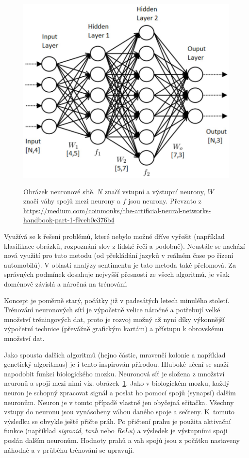 \begin{figure}[!htb]
\centering
\includegraphics[width=\textwidth/2]{neural_network.png}
\label{neuronovasit}
\caption{Obrázek neuronové sítě. $N$ značí vstupní a výstupní neurony, $W$ značí váhy spojů mezi neurony a $f$ jsou  neurony. Převzato z \url{https://medium.com/coinmonks/the-artificial-neural-networks-handbook-part-1-f9ceb0e376b4}}
\end{figure}

 Využívá se k řešení problémů, které nebylo možné dříve vyřešit (například klasifikace obrázků, rozpoznání slov z lidské řeči a podobně). Neustále se nachází nová využití pro tuto metodu (od překládání jazyků v reálném čase po řízení automobilů).
V oblasti analýzy sentimentu je tato metoda také přelomová. Za správných podmínek dosahuje nejvyšší přesnosti ze všech algoritmů, je však doménově závislá a náročná na trénování.


Koncept je poměrně starý, počátky již v padesátých letech minulého století. Trénování neuronových sítí je výpočetně velice náročné a potřebují velké množství tréningových dat, proto je rozvoj možný až nyní díky výkonnější výpočetní technice (převážně grafickým kartám) a přístupu k obrovskému množství dat. 

Jako spousta dalších algoritmů (hejno částic, mravenčí kolonie a například genetický algoritmus) je i tento inspirován přírodou.
Hluboké učení se snaží napodobit funkci biologického mozku. Neuronová síť je složena z množství neuronů a spoji mezi nimi viz. obrázek~\ref{neuronovasit}. 
Jako v biologickém mozku, každý neuron je schopný zpracovat signál a poslat ho pomocí spojů (synapsí) dalším neuronům. Neuron je v tomto případě vlastně jen obyčejná sčítačka. Všechny vstupy do neuronu jsou vynásobeny váhou daného spoje a sečteny. K~tomuto výsledku se obvykle ještě přičte práh. Po přičtení prahu je použita aktivační funkce (například \emph{sigmoid}, \emph{tanh} nebo \emph{ReLu}) a výsledek je výstupními spoji poslán dalším neuronům. 
Hodnoty prahů a vah spojů jsou z počátku nastaveny náhodně a v průběhu trénování se upravují. 


